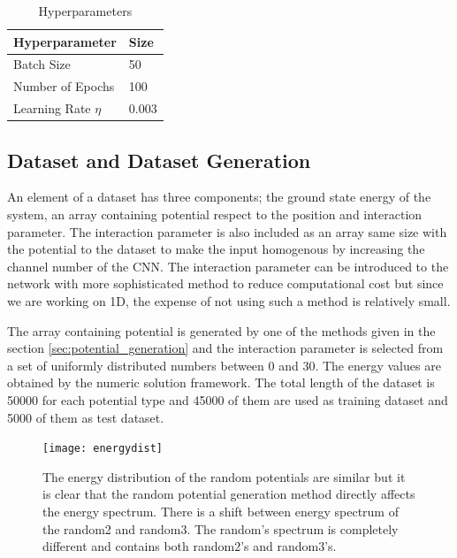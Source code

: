 \documentclass[a4paper,times,hidelinks,12pt]{article}
\begin{document}
\begin{table}[H]
    \centering
    \caption{Hyperparameters}
    \label{tb:hyperparams}
    \begin{tabular}{|l|l|} \hline
    \textbf{Hyperparameter}  & \textbf{Size}  \\ \hline  
    Batch Size               & 50             \\ \hline
    Number of Epochs         & 100            \\ \hline
    Learning Rate $\eta$     & 0.003          \\ \hline
    \end{tabular}
\end{table}


\subsection{Dataset and Dataset Generation}

An element of a dataset has three components; the ground state energy of the system, an array containing potential respect to the position and interaction parameter. The interaction parameter is also included as an array same size with the potential to the dataset to make the input homogenous by increasing the channel number of the CNN. The interaction parameter can be introduced to the network with more sophisticated method to reduce computational cost but since we are working on 1D, the expense of not using such a method is relatively small.

The array containing potential is generated by one of the methods given in the section \ref{sec:potential_generation} and the interaction parameter is selected from a set of uniformly distributed numbers between 0 and 30. The energy values are obtained by the numeric solution framework. The total length of the dataset is 50000 for each potential type and 45000 of them are used as training dataset and 5000 of them as test dataset. 

\graphicspath{{"../figs/dataresults/"}}
\begin{figure}[H]
    \centering
    \texttt{[image: energydist]}
\caption{The energy distribution of the random potentials are similar but it is clear that the random potential generation method directly affects the energy spectrum. There is a shift between energy spectrum of the random2 and random3. The random's spectrum is completely different and contains both random2's and random3's.}
\label{fig:energy_dist}
\end{figure}
\end{document}
